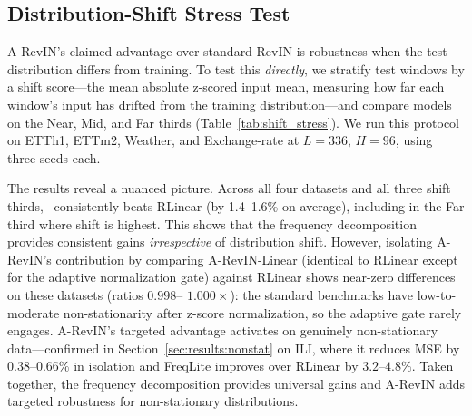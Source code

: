 \subsection{Distribution-Shift Stress Test}
\label{sec:results:shift}

A-RevIN's claimed advantage over standard RevIN is robustness when the test
distribution differs from training. To test this \emph{directly}, we stratify
test windows by a shift score---the mean absolute z-scored input mean, measuring
how far each window's input has drifted from the training distribution---and
compare models on the Near, Mid, and Far thirds (Table~\ref{tab:shift_stress}).
We run this protocol on ETTh1, ETTm2, Weather, and Exchange-rate at $L{=}336$,
$H{=}96$, using three seeds each.


The results reveal a nuanced picture. Across all four datasets and all three
shift thirds, \method\ consistently beats RLinear (by 1.4--1.6\% on average),
including in the Far third where shift is highest. This shows that the
frequency decomposition provides consistent gains \emph{irrespective} of
distribution shift. However, isolating A-RevIN's contribution by comparing
A-RevIN-Linear (identical to RLinear except for the adaptive normalization gate)
against RLinear shows near-zero differences on these datasets (ratios $0.998$--
$1.000\times$): the standard benchmarks have low-to-moderate non-stationarity
after z-score normalization, so the adaptive gate rarely engages. A-RevIN's
targeted advantage activates on genuinely non-stationary data---confirmed in
Section~\ref{sec:results:nonstat} on ILI, where it reduces MSE by $0.38$--$0.66\%$
in isolation and FreqLite improves over RLinear by $3.2$--$4.8\%$. Taken
together, the frequency decomposition provides universal gains and A-RevIN adds
targeted robustness for non-stationary distributions.

